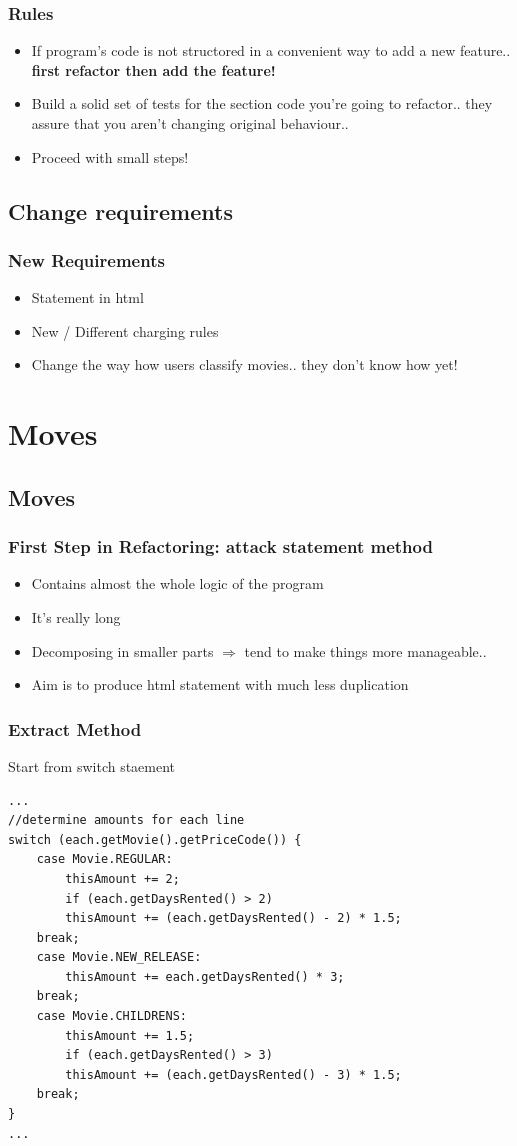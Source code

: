 \documentclass{beamer}
\begin{document}
\begin{frame}
  \frametitle{Rules}
  \begin{itemize}
  	\item If program's code is not structored in a convenient way to add a new feature.. \textbf{first refactor then add the feature!}
  	\item  Build a solid set of tests for the section code you're going to refactor.. they assure that you aren't changing original behaviour.. 
  	\item Proceed with small steps!
    \end{itemize}
\end{frame}

\subsection{Change requirements}
\begin{frame}
  \frametitle{New Requirements}
  \begin{itemize}
  		\item Statement in html
		\item New / Different charging rules
		\item Change the way how users classify movies.. they don't know how yet!
  \end{itemize}
\end{frame}

\section{Moves}
\subsection{Moves}
\begin{frame}
  \frametitle{First Step in Refactoring: attack statement method}
   \begin{itemize}
  		\item Contains almost the whole logic of the program
		\item It's really long
		\item Decomposing in smaller parts $\Rightarrow$ tend to make things more manageable..
		\item Aim is to produce html statement with much less duplication
  \end{itemize}
\end{frame}

\begin{frame}[containsverbatim]
	\frametitle{Extract Method}
	Start from switch staement \\
	\begin{lstlisting}
...
//determine amounts for each line
switch (each.getMovie().getPriceCode()) {
	case Movie.REGULAR:
		thisAmount += 2;
		if (each.getDaysRented() > 2)
		thisAmount += (each.getDaysRented() - 2) * 1.5;
	break;
	case Movie.NEW_RELEASE:
		thisAmount += each.getDaysRented() * 3;
	break;
	case Movie.CHILDRENS:
		thisAmount += 1.5;
		if (each.getDaysRented() > 3)
		thisAmount += (each.getDaysRented() - 3) * 1.5;
	break;
}
...
\end{lstlisting}
\end{frame}
\end{document}
